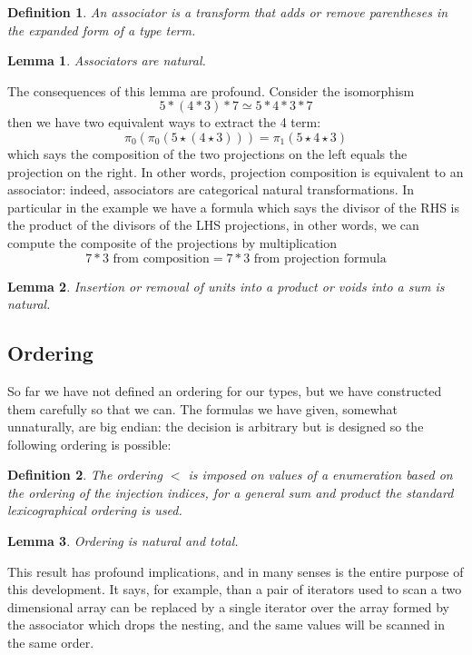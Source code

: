 \documentclass{article}
\newtheorem{lemma}{Lemma}
\newtheorem{definition}{Definition}
\begin{document}
\begin{definition}
An {\em associator} is a transform that adds or remove parentheses in the
expanded form of a type term.
\end{definition}
\begin{lemma}
Associators are natural.
\end{lemma}

The consequences of this lemma are profound. Consider the isomorphism
$$5 * (4 * 3) * 7 \simeq 5 * 4 * 3 * 7$$
then we have two equivalent ways to extract the 4 term:
$$\pi_0 (\pi_0(5 \star (4 \star 3))) = \pi_1 (5 \star 4 \star 3)$$
which says the composition of the two projections on the left equals
the projection on the right. In other words, projection composition
is equivalent to an associator: indeed, associators are categorical
natural transformations. In particular in the example we have a formula
which says the divisor of the RHS is the product of the divisors of the
LHS projections, in other words, we can compute the composite of the projections
by multiplication
$$ 7 * 3 \text{\ from composition} = 7 * 3 \text{\ from projection formula}$$

\begin{lemma}
Insertion or removal of units into a product or voids into a sum is natural.
\end{lemma}

\subsection{Ordering}
So far we have not defined an ordering for our types, but we have constructed
them carefully so that we can. The formulas we have given, somewhat unnaturally,
are big endian: the decision is arbitrary but is designed so the following
ordering is possible:
\begin{definition}
The ordering $<$ is imposed on values of a enumeration based on the 
ordering of the injection indices, for a general sum and product
the standard lexicographical ordering is used.
\end{definition}
\begin{lemma}
Ordering is natural and total.
\end{lemma}

This result has profound implications, and in many senses is the entire
purpose of this development. It says, for example, than a pair of iterators
used to scan a two dimensional array can be replaced by a single iterator
over the array formed by the associator which drops the nesting, and the
same values will be scanned in the same order.
\end{document}
